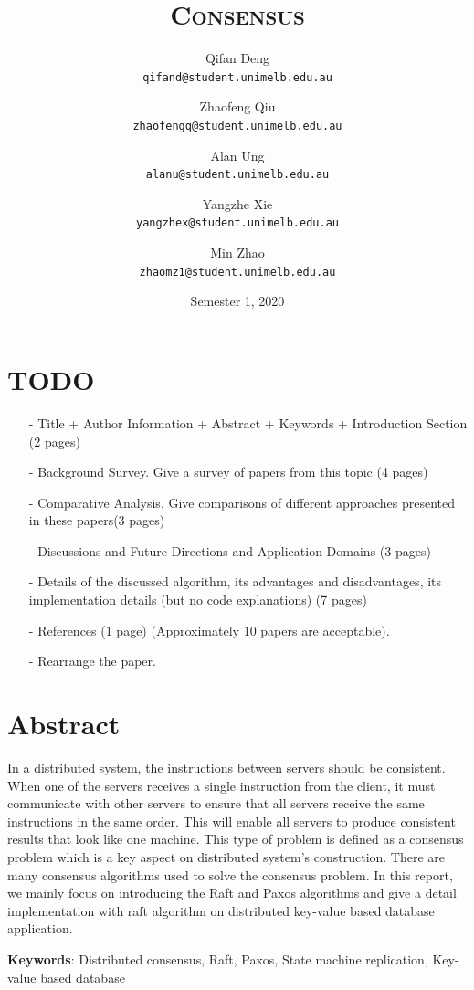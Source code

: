 \documentclass[12pt, a4paper]{article}
\title{\textsc{Consensus}}
\author{
  Qifan Deng \\
  \texttt{\small qifand@student.unimelb.edu.au}
  \and
  Zhaofeng Qiu \\
  \texttt{\small zhaofengq@student.unimelb.edu.au}
  \and
  Alan Ung \\
  \texttt{\small alanu@student.unimelb.edu.au}
  \and
  Yangzhe Xie \\
  \texttt{\small yangzhex@student.unimelb.edu.au}
  \and
  Min Zhao \\
  \texttt{\small zhaomz1@student.unimelb.edu.au}
}
\date{Semester 1, 2020}
\begin{document}
\maketitle
\thispagestyle{firststyle}

\section{TODO}
\begin{itemize}

\item[-] Title + Author Information + Abstract + Keywords + Introduction Section (2 pages)

\item[-] Background Survey. Give a survey of papers from this topic (4 pages)
\item[-] Comparative Analysis. Give comparisons of different
approaches presented in these papers(3 pages)
\item[-] Discussions and Future Directions and Application Domains (3 pages)
\item[-] Details of the discussed algorithm, its advantages and disadvantages, its implementation details (but no code explanations) (7 pages)
\item[-] References (1 page) (Approximately 10 papers are acceptable).
\item[-] Rearrange the paper.
\end{itemize}

\section{Abstract}
In a distributed system, the instructions between servers should be consistent. When one of the servers receives a single instruction from the client, it must communicate with other servers to ensure that all servers receive the same instructions in the same order. This will enable all servers to produce consistent results that look like one machine. This type of problem is defined as a consensus problem which is a key aspect on distributed system’s construction. There are many consensus algorithms used to solve the consensus problem. In this report, we mainly focus on introducing the Raft and Paxos algorithms and give a detail implementation with raft algorithm on distributed key-value based database application.



\textbf{Keywords}: Distributed consensus, Raft, Paxos, State machine replication, Key-value based database
\end{document}
